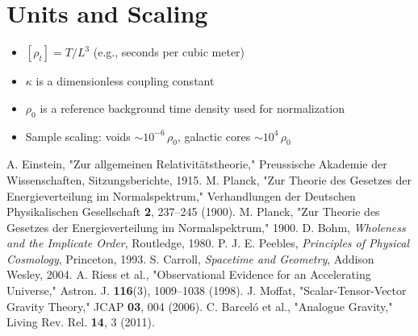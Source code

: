\documentclass[12pt]{article}
\begin{document}
\section{Units and Scaling}
\begin{itemize}
  \item $[\rho_t] = T / L^3$ (e.g., seconds per cubic meter)
  \item $\kappa$ is a dimensionless coupling constant
  \item $\rho_0$ is a reference background time density used for normalization
  \item Sample scaling: voids $\sim 10^{-6} \, \rho_0$, galactic cores $\sim 10^4 \, \rho_0$
\end{itemize}

\begin{thebibliography}{9}
 A. Einstein, "Zur allgemeinen Relativitätstheorie," Preussische Akademie der Wissenschaften, Sitzungsberichte, 1915.
 M. Planck, "Zur Theorie des Gesetzes der Energieverteilung im Normalspektrum," Verhandlungen der Deutschen Physikalischen Gesellschaft \textbf{2}, 237–245 (1900). M. Planck, "Zur Theorie des Gesetzes der Energieverteilung im Normalspektrum," 1900.
 D. Bohm, \textit{Wholeness and the Implicate Order}, Routledge, 1980.
 P. J. E. Peebles, \textit{Principles of Physical Cosmology}, Princeton, 1993.
 S. Carroll, \textit{Spacetime and Geometry}, Addison Wesley, 2004.
 A. Riess et al., "Observational Evidence for an Accelerating Universe," Astron. J. \textbf{116}(3), 1009–1038 (1998).
 J. Moffat, "Scalar-Tensor-Vector Gravity Theory," JCAP \textbf{03}, 004 (2006).
 C. Barceló et al., "Analogue Gravity," Living Rev. Rel. \textbf{14}, 3 (2011).
\end{thebibliography}
\end{document}
